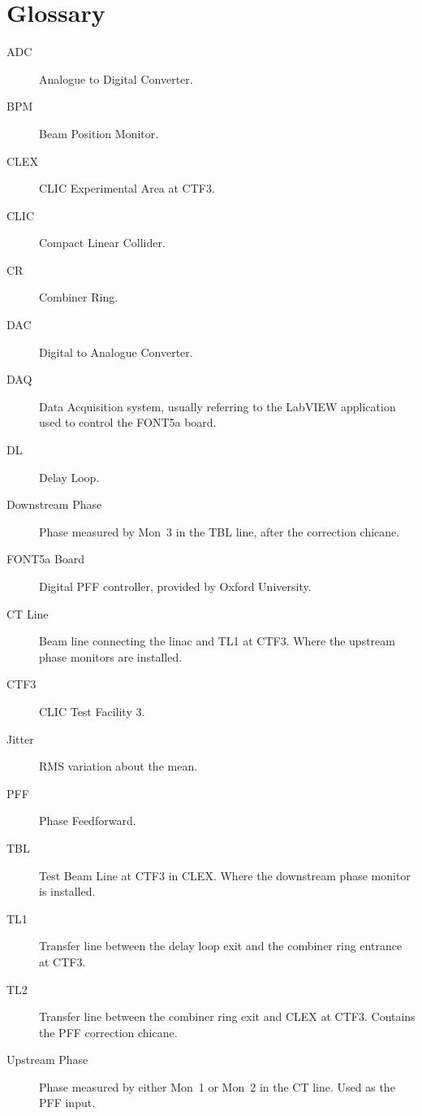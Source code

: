 \cleardoublepage

\chapter*{Glossary}

\pagestyle{plain}

\begin{description}
\item[ADC] Analogue to Digital Converter.
\item[BPM] Beam Position Monitor.
\item[CLEX] CLIC Experimental Area at CTF3.
\item[CLIC] Compact Linear Collider.
\item[CR] Combiner Ring.
\item[DAC] Digital to Analogue Converter.
\item[DAQ] Data Acquisition system, usually referring to the LabVIEW application used to control the FONT5a board.
\item[DL] Delay Loop.
\item[Downstream Phase] Phase measured by Mon~3 in the TBL line, after the correction chicane.
\item[FONT5a Board] Digital PFF controller, provided by Oxford University.
\item[CT Line] Beam line connecting the linac and TL1 at CTF3. Where the upstream phase monitors are installed.
\item[CTF3] CLIC Test Facility 3.
\item[Jitter] RMS variation about the mean.
\item[PFF] Phase Feedforward.
\item[TBL] Test Beam Line at CTF3 in CLEX. Where the downstream phase monitor is installed.
\item[TL1] Transfer line between the delay loop exit and the combiner ring entrance at CTF3.
\item[TL2] Transfer line between the combiner ring exit and CLEX at CTF3. Contains the PFF correction chicane.
\item[Upstream Phase] Phase measured by either Mon~1 or Mon~2 in the CT line. Used as the PFF input.


\end{description}
